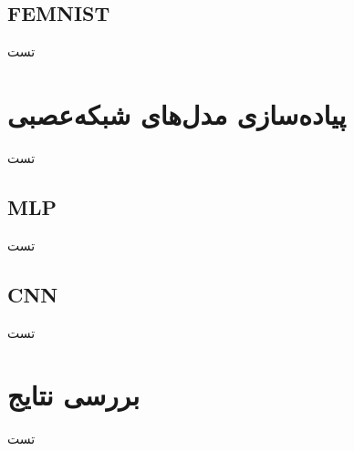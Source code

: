 \subsection{FEMNIST}
تست


\section{پیاده‌سازی مدل‌های شبکه‌عصبی}
تست

\subsection{MLP}
تست

\subsection{CNN}
تست



\section{بررسی نتایج}
تست



